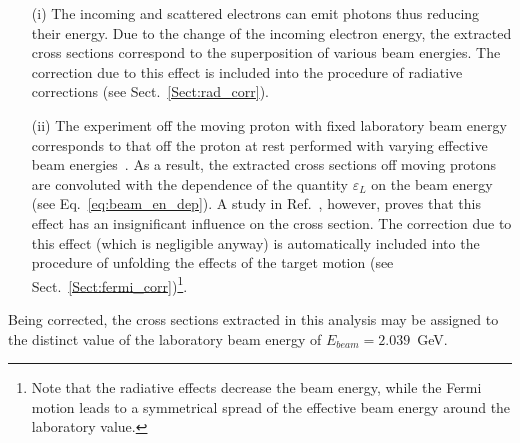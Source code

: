 \begin{itemize}


\item [(i)] The incoming and scattered electrons can emit photons thus reducing their energy. Due to the change of the incoming electron energy, the extracted cross sections correspond to the superposition of various beam energies. The correction due to this effect is included into the procedure of radiative corrections (see Sect.~\ref{Sect:rad_corr}).


\item [(ii)] The experiment off the moving proton with fixed laboratory beam energy corresponds to that off the proton at rest performed with varying effective beam energies~\cite{twopeg-d}. As a result, the extracted cross sections off moving protons are convoluted with the dependence of the quantity  $\varepsilon_{L}$ on the beam energy (see Eq.~\eqref{eq:beam_en_dep}). A study in Ref.~\cite{twopeg-d}, however, proves that this effect has an insignificant influence on the cross section. The correction due to this effect (which is negligible anyway) is automatically included into the procedure of unfolding the effects of the target motion (see Sect.~\ref{Sect:fermi_corr})\footnote[2]{Note that the radiative effects decrease the beam energy, while the Fermi motion leads to a symmetrical spread of the effective beam energy around the laboratory value.}. 


\end{itemize}



Being corrected, the cross sections extracted in this analysis may be assigned to the distinct value of the laboratory beam energy of $E_{beam} = 2.039$~GeV.



